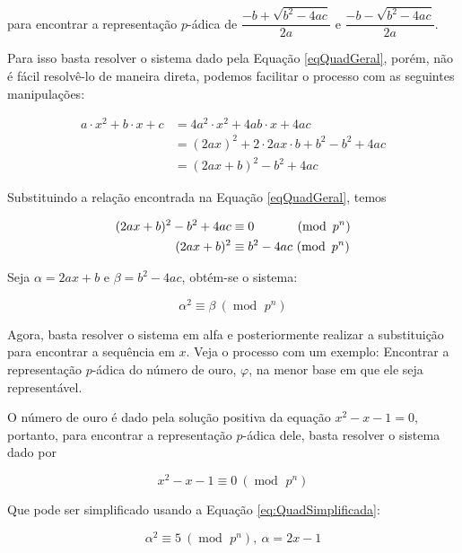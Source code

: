 \documentclass{report}
\DeclareMathOperator{\modulo}{mod \ }
\theoremstyle{definition}
\begin{document}
\smallskip

para encontrar a representação $p$-ádica de $\dfrac{-b + \sqrt{b^2-4ac}}{2a}$ e $\dfrac{-b - \sqrt{b^2-4ac}}{2a}$.

\smallskip

Para isso basta resolver o sistema dado pela Equação \ref{eqQuadGeral}, porém, não é fácil resolvê-lo de maneira direta, podemos facilitar o processo com as seguintes manipulações:

\begin{align*}
    a \cdot x^2 + b \cdot x + c &= 4a^2 \cdot x^2 + 4ab \cdot x + 4ac \\
                                &= (2ax)^2 + 2 \cdot 2ax \cdot b + b^2 - b^2 + 4ac \\
                                &= (2ax+b)^2 - b^2 + 4ac
\end{align*}

Substituindo a relação encontrada na Equação \ref{eqQuadGeral}, temos

\begin{align*}
    (2ax+b)^2 - b^2 + 4ac &\equiv 0\hphantom{^2 - 4ac} \ (\modulo p^n) \\
    (2ax+b)^2             &\equiv b^2 - 4ac \ (\modulo p^n) 
\end{align*}

Seja $\alpha = 2ax+b$ e $\beta = b^2 - 4ac$, obtém-se o sistema:

\begin{equation}\label{eq:QuadSimplificada}
    \alpha^2 \equiv \beta \ (\modulo p^n) 
\end{equation}

Agora, basta resolver o sistema em alfa e posteriormente realizar a substituição para encontrar a sequência em $x$. Veja o processo com um exemplo: Encontrar a representação $p$-ádica do número de ouro, $\varphi$, na menor base em que ele seja representável.

\bigskip

O número de ouro é dado pela solução positiva da equação $x^2 - x - 1 = 0$, portanto, para encontrar a representação $p$-ádica dele, basta resolver o sistema dado por

\begin{equation*}
    x^2 - x - 1 \equiv 0 \ (\modulo p^n)
\end{equation*}

Que pode ser simplificado usando a Equação \ref{eq:QuadSimplificada}:

\begin{equation*}
    \alpha^2 \equiv 5 \ (\modulo p^n), \ \alpha = 2x-1
\end{equation*}
\end{document}
